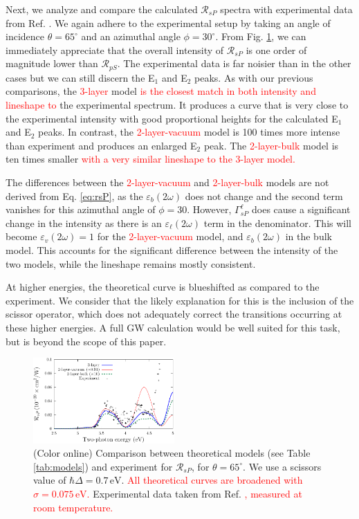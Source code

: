 \documentclass[prb,superscriptaddress,showpacs,twocolumn,letterpaper]{revtex4}
\newcommand{\correction}[1]{\textcolor{red}{#1}}
\newcommand{\change}[1]{\textcolor{red}{#1}}
\begin{document}
Next, we analyze and compare the calculated $\mathcal{R}_{sP}$ spectra with
experimental data from Ref. . We again adhere to the
experimental setup by taking an angle of incidence $\theta=65^{\circ}$ and an
azimuthal angle $\phi=30^\circ$. From Fig. \ref{fig:RsP}, we can immediately
appreciate that the overall intensity of $\mathcal{R}_{sP}$ is one order of
magnitude lower than $\mathcal{R}_{pS}$. The experimental data is far noisier
than in the other cases but we can still discern the E$_{1}$ and E$_{2}$ peaks.
As with our previous comparisons, the \correction{3-layer} model
\change{is the closest match in both intensity and lineshape to
} %
the experimental spectrum. It produces a curve that is very close to the
experimental intensity with good proportional heights for the calculated E$_{1}$
and E$_{2}$ peaks. In contrast, the \correction{2-layer-vacuum} model is 100
times more intense than experiment and produces an enlarged E$_{2}$ peak. The
\correction{2-layer-bulk} model is ten times smaller
\change{with a very similar lineshape to the \correction{3-layer} model.}

The differences between the \correction{2-layer-vacuum} and
\correction{2-layer-bulk} models are not derived from Eq. \eqref{eq:rsP}, as the
$\varepsilon_{b}(2\omega)$ does not change and the second term vanishes for this
azimuthal angle of $\phi = 30$. However, $\Gamma^{\ell}_{sP}$ does cause a
significant change in the intensity as there is an $\varepsilon_{\ell}(2\omega)$
term in the denominator. This will become $\varepsilon_{v}(2\omega) = 1$ for the
\correction{2-layer-vacuum} model, and $\varepsilon_{b}(2\omega)$ in the bulk
model. This accounts for the significant difference between the intensity of the
two models, while the lineshape remains mostly consistent.

At higher energies, the theoretical curve is blueshifted as compared to the
experiment. We consider that the likely explanation for this is the inclusion of
the scissor operator, which does not adequately correct the transitions
occurring at these higher energies. A full GW calculation would be well suited
for this task, but is beyond the scope of this paper.

\begin{figure}[t]
\centering
\includegraphics[width=0.48\textwidth]{fig6}
\caption{(Color online) Comparison between theoretical models (see Table
\ref{tab:models}) and experiment for $\mathcal{R}_{sP}$, for
$\theta=65^{\circ}$. We use a scissors value of $\hbar\Delta = 0.7\,\text{eV}$.
\correction{All theoretical curves are broadened with $\sigma=0.075\,\text{eV}$.
} %
Experimental data taken from Ref.
\correction{, measured at room temperature.} %
\label{fig:RsP}}
\end{figure}
\end{document}
